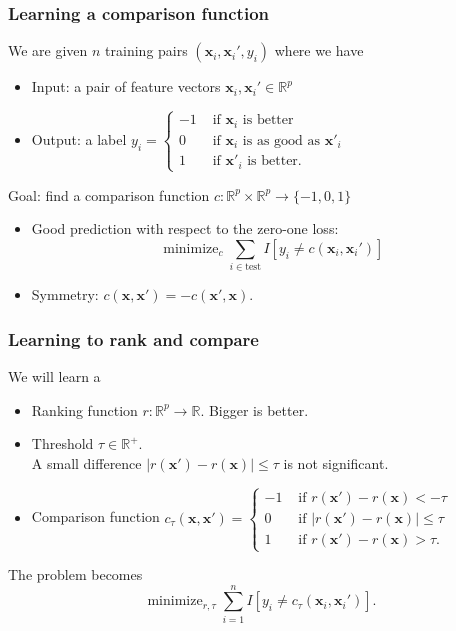 \documentclass{beamer}
\DeclareMathOperator*{\minimize}{minimize}
\newcommand{\RR}{\mathbb R}
\begin{document}
\begin{frame}
  \frametitle{Learning a comparison function}
  We are given $n$ training pairs $(\mathbf x_i,\mathbf x_i',y_i)$ where we have
  \begin{itemize}
  \item Input: a pair of feature vectors $\mathbf x_i,\mathbf x_i'\in\RR^p$
  \item Output: a label $y_i=
  \begin{cases}
    -1 & \text{ if $\mathbf x_i$ is better}\\
    0 & \text{ if $\mathbf x_i$ is as good as $\mathbf x'_i$}\\
    1 & \text{ if $\mathbf x'_i$ is better}.
  \end{cases}
$
  \end{itemize}
  Goal: find a comparison function
  $c:\RR^p\times\RR^p\rightarrow\{-1,0,1\}$
\begin{itemize}
\item Good prediction with respect to the zero-one loss:
$$\minimize_c \sum_{i\in\text{test}} 
I\left[ y_i \neq c(\mathbf x_i,\mathbf x_i') \right]$$
\item Symmetry: $c(\mathbf x,\mathbf x') = -c(\mathbf x',\mathbf x)$.
\end{itemize}
\end{frame}

\begin{frame}
  \frametitle{Learning to rank and compare}
  We will learn a
  \begin{itemize}
  \item Ranking function $r:\RR^p\rightarrow\RR$. Bigger is better.
  \item Threshold $\tau\in\RR^+$. \\A small difference
    $|r(\mathbf x')-r(\mathbf x)|\leq \tau$ is not significant.
  \item Comparison function $c_\tau(\mathbf x, \mathbf x') =
  \begin{cases}
    -1 & \text{ if }r(\mathbf x')-r(\mathbf x) < -\tau\\
    0 & \text{ if }|r(\mathbf x')-r(\mathbf x)|\leq \tau\\
    1 & \text{ if }r(\mathbf x')-r(\mathbf x) > \tau.
  \end{cases}
$
\end{itemize}
The problem becomes
$$\minimize_{r,\tau} \sum_{i=1}^n 
I\left[ y_i\neq c_\tau(\mathbf x_i, \mathbf x_i') \right].$$
\end{frame}
\end{document}
